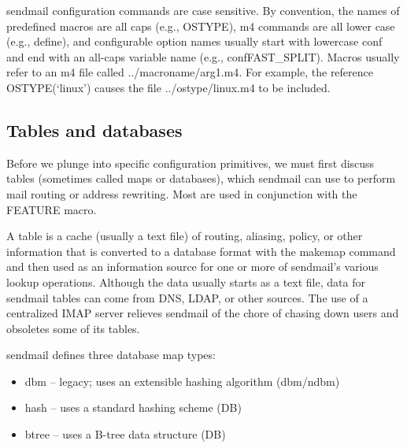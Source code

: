 {sendmail} configuration commands are case sensitive. By convention, the
names of predefined macros are all caps (e.g., {OSTYPE}), {m4} commands
are all lower case (e.g., {define}), and configurable option names
usually start with lowercase {conf} and end with an all-caps variable
name (e.g., {confFAST\_SPLIT}). Macros usually refer to an {m4} file
called {../}{macroname}{/}{arg1}{.m4}. For example, the reference
{OSTYPE(`linux')} causes the file {../ostype/linux.m4} to be included.

\protect\hypertarget{part0026_split_033.html}{}{}

\hypertarget{part0026_split_033.htmlux5cux23_idContainer1247}{}
\hypertarget{part0026_split_033.htmlux5cux23calibre_pb_32}{%
\subsection[Tables and
databases]{\texorpdfstring{\protect\hypertarget{part0026_split_033.htmlux5cux23_idTextAnchor1062}{}{}Tables
and
databases}{Tables and databases}}\label{part0026_split_033.htmlux5cux23calibre_pb_32}}

\protect\hypertarget{part0026_split_033.htmlux5cux23_idIndexMarker2512}{}{}Before
we plunge into specific configuration primitives, we must first discuss
tables (sometimes called maps or databases), which {sendmail} can use to
perform mail routing or address rewriting. Most are used in conjunction
with the {FEATURE} macro.

A table is a cache (usually a text file) of routing, aliasing, policy,
or other information that is converted to a database format with the
{makemap} command and then used as an information source for one or more
of {sendmail}'s various lookup operations. Although the data usually
starts as a text file, data for {sendmail} tables can come from DNS,
LDAP, or other sources. The use of a centralized IMAP server relieves
{sendmail} of the chore of chasing down users and obsoletes some of its
tables.

{sendmail} defines three
da\protect\hypertarget{part0026_split_033.htmlux5cux23_idTextAnchor1063}{}{}tabase
map types:

\begin{itemize}
\tightlist
\item
  {dbm} -- legacy; uses an extensible hashing algorithm ({dbm}/{ndbm})
\item
  {hash} -- uses a standard hashing scheme (DB)
\item
  {btree} -- uses a B-tree data structure (DB)
\end{itemize}

